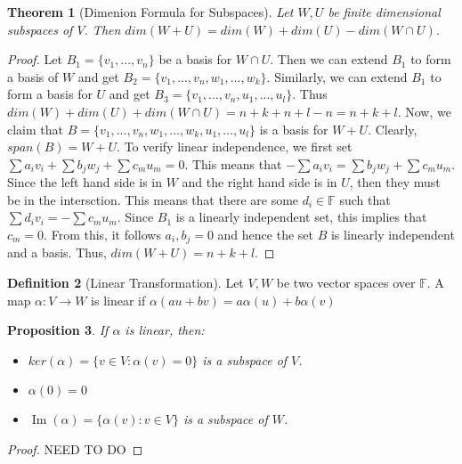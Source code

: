 \documentclass{tufte-handout}
\newtheorem{thm}{Theorem}
\newtheorem{prop}[thm]{Proposition}
\theoremstyle{definition}
\newtheorem{defn}[thm]{Definition}
\theoremstyle{remark}
\newcommand{\F}{\mathbb{F}}
\DeclareMathOperator{\im}{Im}
\begin{document}
\begin{thm}[Dimenion Formula for Subspaces]
Let $W, U$ be finite dimensional subspaces of $V$. Then $dim(W+U) = dim(W) + dim(U) - dim(W \cap U)$.
\end{thm}
\begin{proof}
Let $B_1 = \{v_1, ..., v_n\}$ be a basis for $W\cap U$. Then we can extend $B_1$ to form a basis of $W$ and get $B_2 = \{v_1, ..., v_n, w_1, ..., w_k\}$. Similarly, we can extend $B_1$ to form a basis for $U$ and get $B_3 = \{v_1, ..., v_n, u_1, ..., u_l\}$. Thus $dim(W) + dim(U) + dim(W \cap U) = n + k + n + l - n = n+k+l$. Now, we claim that $B = \{v_1, ..., v_n, w_1, ..., w_k, u_1, ..., u_l\}$ is a basis for $W+U$. Clearly, $span(B) = W+U$. To verify linear independence, we first set $\sum a_i v_i + \sum b_j w_j + \sum c_m u_m = 0$. This means that $-\sum a_i v_i = \sum b_j w_j + \sum c_m u_m$. Since the left hand side is in $W$ and the right hand side is in $U$, then they must  be in the intersction. This means that there are some $d_i \in \F$ such that $\sum d_i v_i = -\sum c_m u_m$. Since $B_1$ is a linearly independent set, this implies that $c_m = 0$. From this, it follows $a_i, b_j = 0$ and hence the set $B$ is linearly independent and a basis. Thus, $dim(W+U) = n+k+l$. 
\end{proof} 

\begin{defn}[Linear Transformation]
Let $V, W$ be two vector spaces over $\F$. A map $\alpha: V \rightarrow W$ is linear if $\alpha(au+bv) = a\alpha(u) + b\alpha(v)$
\end{defn}
\begin{prop}
If $\alpha$ is linear, then:
\begin{itemize}
\item $ker(\alpha) = \{ v\in V : \alpha(v) = 0\}$ is a subspace of $V$.
\item $\alpha(0) = 0$
\item $\im(\alpha) = \{\alpha(v) : v\in V  \}$ is a subspace of $W$.
\end{itemize}
\end{prop}

\begin{proof}
    NEED TO DO
\end{proof}
\end{document}
